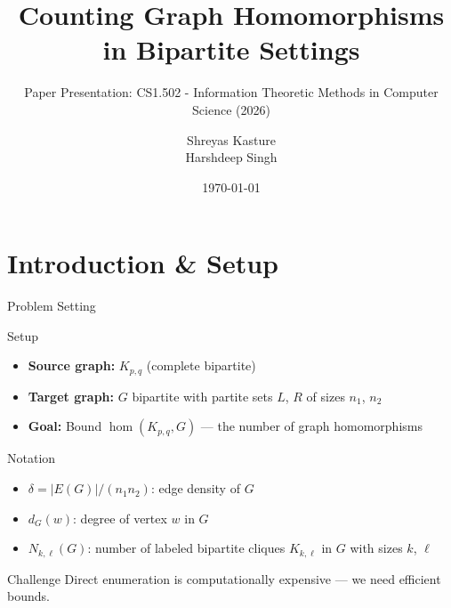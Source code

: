 \documentclass[10pt]{beamer}
\title[Homomorphism Counting]{Counting Graph Homomorphisms in Bipartite Settings}
\subtitle{Paper Presentation: CS1.502 - Information Theoretic Methods in Computer Science (2026)}
\author{Shreyas Kasture  \\ Harshdeep Singh }
\institute{IIIT Hyderabad}
\date{\today}
\begin{document}
\begin{frame}
  \titlepage
\end{frame}


\section{Introduction \& Setup}

\begin{frame}{Problem Setting}
  \begin{block}{Setup}
    \begin{itemize}
      \item \textbf{Source graph:} $K_{p,q}$ (complete bipartite)
      \item \textbf{Target graph:} $G$ bipartite with partite sets $L$, $R$ of sizes $n_1$, $n_2$
      \item \textbf{Goal:} Bound $\hom(K_{p,q}, G)$ --- the number of graph homomorphisms
    \end{itemize}
  \end{block}

  \begin{block}{Notation}
    \begin{itemize}
      \item $\delta = |E(G)|/(n_1 n_2)$: edge density of $G$
      \item $d_G(w)$: degree of vertex $w$ in $G$
      \item $N_{k,\ell}(G)$: number of labeled bipartite cliques $K_{k,\ell}$ in $G$ with sizes $k$, $\ell$
    \end{itemize}
  \end{block}

  \begin{alertblock}{Challenge}
    Direct enumeration is computationally expensive --- we need efficient bounds.
  \end{alertblock}
\end{frame}
\end{document}
